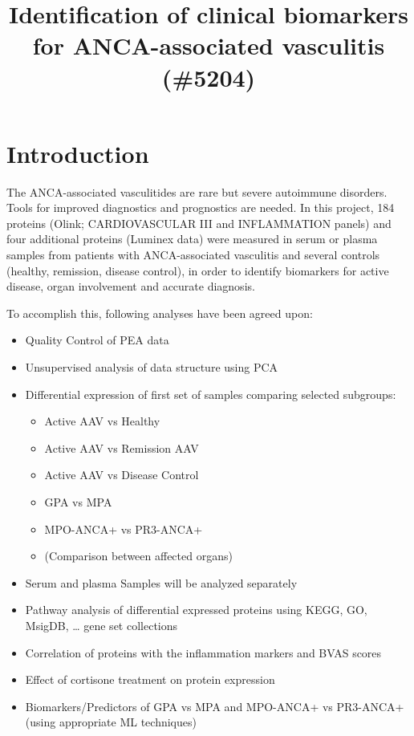 \documentclass[
]{book}
\title{Identification of clinical biomarkers for ANCA-associated vasculitis (\#5204)}
\author{}
\date{\vspace{-2.5em}}
\providecommand{\tightlist}{%
  \setlength{\itemsep}{0pt}\setlength{\parskip}{0pt}}
\begin{document}
\maketitle

{
\setcounter{tocdepth}{1}
\tableofcontents
}
\hypertarget{introduction}{%
\chapter{Introduction}\label{introduction}}

The ANCA-associated vasculitides are rare but severe autoimmune disorders.
Tools for improved diagnostics and prognostics are needed. In this project, 184
proteins (Olink; CARDIOVASCULAR III and INFLAMMATION panels) and four
additional proteins (Luminex data) were measured in serum or plasma samples
from patients with ANCA-associated vasculitis and several controls (healthy,
remission, disease control), in order to identify biomarkers for active
disease, organ involvement and accurate diagnosis.

To accomplish this, following analyses have been agreed upon:

\begin{itemize}
\tightlist
\item
  Quality Control of PEA data
\item
  Unsupervised analysis of data structure using PCA
\item
  Differential expression of first set of samples comparing selected subgroups:

  \begin{itemize}
  \tightlist
  \item
    Active AAV vs Healthy
  \item
    Active AAV vs Remission AAV
  \item
    Active AAV vs Disease Control
  \item
    GPA vs MPA
  \item
    MPO-ANCA+ vs PR3-ANCA+
  \item
    (Comparison between affected organs)
  \end{itemize}
\item
  Serum and plasma Samples will be analyzed separately
\item
  Pathway analysis of differential expressed proteins using KEGG, GO, MsigDB, \ldots{} gene set collections
\item
  Correlation of proteins with the inflammation markers and BVAS scores
\item
  Effect of cortisone treatment on protein expression
\item
  Biomarkers/Predictors of GPA vs MPA and MPO-ANCA+ vs PR3-ANCA+ (using appropriate ML techniques)
\end{itemize}
\end{document}
